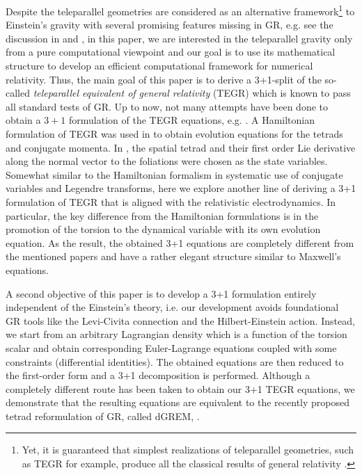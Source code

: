 \documentclass[
10pt, %
a4paper, %
oneside, %
twocolumn,
headinclude,footinclude, %
BCOR5mm, %
]{scrartcl}
\begin{document}
	Despite the teleparallel geometries are considered as an alternative
	framework\footnote{Yet, it is guaranteed that simplest realizations of
	teleparallel geometries, such as TEGR for example, produce all the classical
	results of general relativity \cite{AldrovandiPereiraBook,Bahamonde2021a}.}
	to Einstein's gravity with several promising features missing in GR, e.g.
	see the discussion in \cite[Sec.18]{AldrovandiPereiraBook} and
	\cite{Cai2016}, in this paper, we are interested in the teleparallel gravity
	only from a pure computational viewpoint and our goal is to use its
	mathematical structure to develop an efficient computational framework for
	numerical relativity. Thus, the main goal of this paper is to derive a
	3+1-split of the so-called \emph{teleparallel equivalent of general
	relativity} (TEGR) \cite{AldrovandiPereiraBook,Krssak2019} which is known to
	pass all standard tests of GR. Up to now, not many attempts have been done
	to obtain a $ 3+1 $ formulation of the TEGR equations, e.g.
	\cite{Maluf2001a,Capozziello2021,Pati2022}. A Hamiltonian formulation of
	TEGR was used in \cite{Maluf2001a,Pati2022} to obtain evolution equations
	for the tetrads and conjugate momenta. In \cite{Capozziello2021}, the
	spatial tetrad and their first order Lie derivative along the normal vector
	to the foliations were chosen as the state variables. Somewhat similar to
	the Hamiltonian formalism in systematic use of conjugate variables and
	Legendre transforms, here we explore another line of deriving a 3+1
	formulation of TEGR that is aligned with the relativistic
	electrodynamics. In particular, the key difference from the Hamiltonian
	formulations \cite{Maluf2001a,Pati2022} is in the promotion of the torsion
	to the dynamical variable with its own evolution equation. As the result,
	the obtained 3+1 equations are completely different from the mentioned
	papers and have a rather elegant structure similar to Maxwell's equations.

	A second objective of this paper is to develop a 3+1 formulation entirely
	independent of the Einstein's theory, i.e. our development avoids
	foundational GR tools like the Levi-Civita connection and the
	Hilbert-Einstein action. Instead, we start from an arbitrary Lagrangian
	density which is a function of the torsion scalar and obtain corresponding
	Euler-Lagrange equations coupled with some constraints (differential
	identities). The obtained equations are then reduced to the first-order form
	and a 3+1 decomposition is performed. Although a completely different route
	has been taken to obtain our 3+1 TEGR equations, we demonstrate that the
	resulting equations are equivalent to the recently proposed tetrad
	reformulation of GR, called dGREM, \cite{Olivares2022}.
\end{document}
